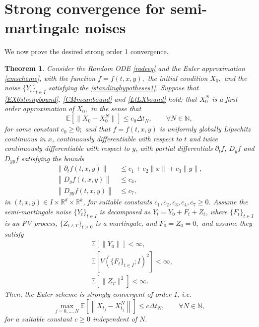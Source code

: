 \documentclass[reqno,12pt]{amsart}
\theoremstyle{plain} %
\newtheorem{theorem}{Theorem}[section]
\theoremstyle{definition} %
\begin{document}
\section{Strong convergence for semi-martingale noises}
\label{secsubmartingale}

We now prove the desired strong order 1 convergence.

\begin{theorem}
    \label{thmsemimartingale}
    Consider the Random ODE \eqref{rodeeq} and the Euler approximation \eqref{emscheme}, with the function $f=f(t, x, y),$ the initial condition $X_0,$ and the noise $\{Y_t\}_{t\in I}$ satisfying the \cref{standinghypotheses1}. Suppose  that \cref{EX0strongbound}, \cref{CMmeanbound} and \cref{LtLXbound} hold; that $X_0^N$ is a first order approximation of $X_0,$ in the sense that 
    \begin{equation}
        \label{EX0X0Nunif}
        \mathbb{E}[\|X_0 - X_0^N\|] \leq c_0 \Delta t_N, \qquad \forall N\in \mathbb{N},
    \end{equation}
    for some constant $c_0 \geq 0;$ and that $f=f(t, x, y)$ is uniformly globally Lipschitz continuous in $x$, continuously differentiable with respect to $t$ and twice continuously differentiable with respect to $y$, with partial differentials $\partial_t f$, $D_y f$ and $D_{yy} f$ satisfying the bounds
    \begin{align}
        \label{ftfyunifboundcadlagfvpartialt}
        \left\|\partial_t f(t, x, y)\right\| & \leq c_1 + c_2\|x\| + c_3\|y\|, \\
        \label{ftfyunifboundcadlagfvpartialy}
        \left\|D_y f(t, x, y)\right\| & \leq c_4, \\
        \label{ftfyunifboundcadlagfvpartialyy}
        \left\|D_{yy} f(t, x, y)\right\| & \leq c_7,
    \end{align}
    in $(t, x, y)\in I\times \mathbb{R}^d\times \mathbb{R}^k$, for suitable constants $c_1, c_2, c_3, c_4, c_7 \geq 0$. Assume the semi-martingale noise $\{Y_t\}_{t\in I}$ is decomposed as $Y_t = Y_0 + F_t + Z_t$, where $\{F_t\}_{t\in I}$ is an FV process, $\{Z_{t \wedge T}\}_{t\geq 0}$ is a martingale, and $F_0 = Z_0 = 0,$ and assume they satisfy
    \begin{align}
        \label{Y0finiteexpectation}
        & \mathbb{E}\left[\|Y_0\|\right] < \infty, \\
        \label{expectFVFtfinite}
        & \mathbb{E}\left[V(\{F_t\}_{t\in I}; I)^{2}\right] < \infty, \\
        \label{Zmartingale}
        & \mathbb{E}\left[\|Z_T\|^2\right] < \infty.
    \end{align}   
    Then, the Euler scheme is strongly convergent of order 1, i.e.
    \begin{equation}
        \label{ordersemimartingaleunif}
        \max_{j=0, \ldots, N} \mathbb{E}\left[\left\| X_{t_j} - X_{t_j}^N \right\|\right] \leq c \Delta t_N, \qquad \forall N \in \mathbb{N},
    \end{equation}
    for a suitable constant $c\geq 0$ independent of $N.$
\end{theorem}
\end{document}

